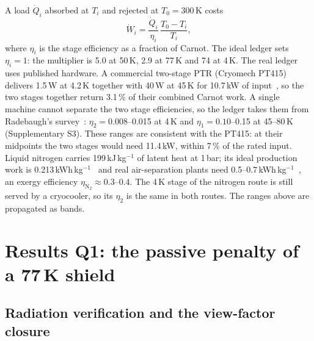 \documentclass[preprint,12pt]{elsarticle}
\begin{document}
A load $\dot Q_i$ absorbed at $T_i$ and rejected at $T_0=300$\,K costs
\begin{equation}
\dot W_i=\frac{\dot Q_i}{\eta_i}\,\frac{T_0-T_i}{T_i},
\label{eq:ledger}
\end{equation}
where $\eta_i$ is the stage efficiency as a fraction of Carnot. The ideal ledger sets
$\eta_i=1$: the multiplier is 5.0 at 50\,K, 2.9 at 77\,K and 74 at 4\,K. The real ledger uses
published hardware. A commercial two-stage PTR (Cryomech PT415) delivers 1.5\,W at 4.2\,K together with 40\,W at
45\,K for 10.7\,kW of input~\cite{Bluefors2026PT415}, so the two stages together return
3.1\,\% of their combined Carnot work. A single machine cannot separate the two stage
efficiencies, so the ledger takes them from Radebaugh's survey~\cite{Radebaugh2009Cryocoolers}:
$\eta_2=0.008$--0.015 at 4\,K and $\eta_1=0.10$--0.15 at 45--80\,K (Supplementary S3). These
ranges are consistent with the PT415: at their midpoints the two stages would need 11.4\,kW,
within 7\,\% of the rated input. Liquid nitrogen
carries 199\,kJ\,kg$^{-1}$ of latent heat at 1\,bar; its ideal production work is
0.213\,kWh\,kg$^{-1}$~\cite{BarronNellis2016Cryogenic} and real air-separation plants need
0.5--0.7\,kWh\,kg$^{-1}$~\cite{Karabuga2018N2Liquefaction}, an exergy efficiency
$\eta_{\mathrm{N_2}}\approx0.3$--0.4. The 4\,K stage of the nitrogen route is still served by a
cryocooler, so its $\eta_2$ is the same in both routes. The ranges above are propagated as
bands.

\section{Results Q1: the passive penalty of a 77\,K shield}
\label{sec:res-q1}

\subsection{Radiation verification and the view-factor closure}
\label{sec:res-q1-rad}
\end{document}
